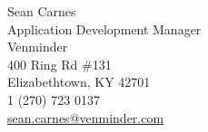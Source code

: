 Sean Carnes
\\ Application Development Manager
\\ Venminder
\\ 400 Ring Rd \#131 
\\ Elizabethtown, KY 42701
\\ 1 (270) 723 0137
\\ \href{mailto:sean.carnes@venminder.com}{sean.carnes@venminder.com}
